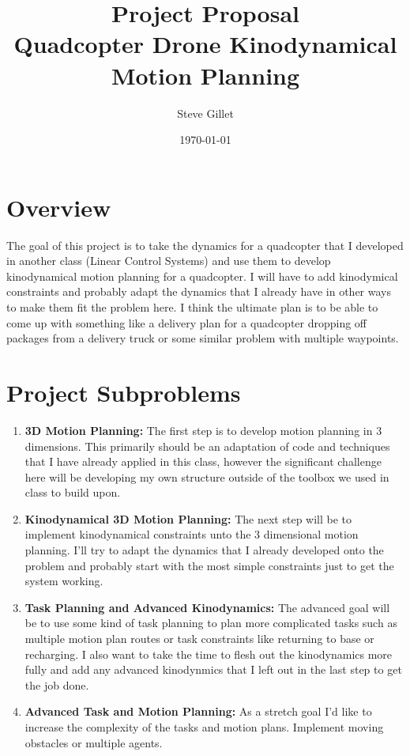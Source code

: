 \documentclass{article}
\title{Project Proposal \\ \large Quadcopter Drone Kinodynamical Motion Planning}
\author{Steve Gillet}
\date{\today}
\begin{document}
\maketitle

\section*{Overview}
The goal of this project is to take the dynamics for a quadcopter that I developed in another class (Linear Control Systems) and use them to develop kinodynamical motion planning for a quadcopter.
I will have to add kinodymical constraints and probably adapt the dynamics that I already have in other ways to make them fit the problem here.
I think the ultimate plan is to be able to come up with something like a delivery plan for a quadcopter dropping off packages from a delivery truck or some similar problem with multiple waypoints.

\section*{Project Subproblems}

\begin{enumerate}[label=\textbf{\arabic*.}]
    \item \textbf{3D Motion Planning:} The first step is to develop motion planning in 3 dimensions. This primarily should be an adaptation of code and techniques that I have already applied in this class, however the significant challenge here will be developing my own structure outside of the toolbox we used in class to build upon.
    
    \item \textbf{Kinodynamical 3D Motion Planning:} The next step will be to implement kinodynamical constraints unto the 3 dimensional motion planning. I'll try to adapt the dynamics that I already developed onto the problem and probably start with the most simple constraints just to get the system working.
    
    \item \textbf{Task Planning and Advanced Kinodynamics:} The advanced goal will be to use some kind of task planning to plan more complicated tasks such as multiple motion plan routes or task constraints like returning to base or recharging. I also want to take the time to flesh out the kinodynamics more fully and add any advanced kinodynmics that I left out in the last step to get the job done.
    
    \item \textbf{Advanced Task and Motion Planning:} As a stretch goal I'd like to increase the complexity of the tasks and motion plans. Implement moving obstacles or multiple agents.
\end{enumerate}
\end{document}
